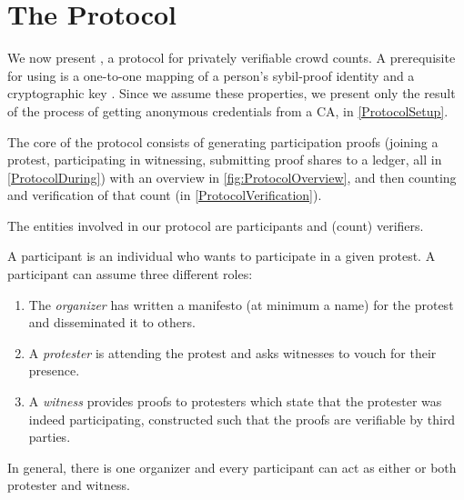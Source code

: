 \section{The \CROCUS Protocol}%
\label{Protocol}


We now present \CROCUS, a protocol for privately verifiable crowd
counts. A prerequisite for using \CROCUS is a one-to-one mapping of a person's
sybil-proof identity and a cryptographic key%
. Since we assume these properties, we
present only the result of the process of getting anonymous
credentials from a \ac{CA}, in \cref{ProtocolSetup}.

The core of the \CROCUS protocol consists of generating participation
proofs (joining a protest, participating in witnessing, submitting
proof shares to a ledger, all in \cref{ProtocolDuring}) with an overview in \cref{fig:ProtocolOverview}, and then counting and
verification of that count (in \cref{ProtocolVerification}). 


The entities involved in our protocol are participants and (count) verifiers.

A participant is an individual who wants to participate in a given 
protest.
A participant can assume three different roles:
\begin{enumerate}
\item The \emph{organizer} has written a manifesto (at minimum a name) for the protest and 
  disseminated it to others.
\item A \emph{protester} is attending the protest and asks witnesses to vouch 
  for their presence.
\item A \emph{witness} provides proofs to protesters which state that the 
  protester was indeed participating, constructed such that the proofs are verifiable by 
  third parties.
\end{enumerate}
In general, there is one organizer and every participant can act as
either or both protester and witness.

